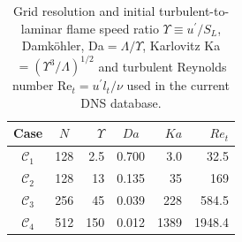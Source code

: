 \begin{table}[]
\centering
\begin{tabular}{ccrcrr}
\toprule
Case & $N$ & $\Upsilon$ & $Da$ & $Ka$ & $Re_t$ \\
\midrule
$\mathcal{C}_1$ & 128 & 2.5 & 0.700 & 3.0 & 32.5 \\
$\mathcal{C}_2$ & 128 & 13 & 0.135 & 35 & 169 \\
$\mathcal{C}_3$ & 256 & 45 & 0.039 & 228 & 584.5 \\
$\mathcal{C}_4$ & 512 & 150 & 0.012 & 1389 & 1948.4\\
\bottomrule
\end{tabular}
\caption{Grid resolution and initial turbulent-to-laminar flame speed ratio $\Upsilon \equiv u^{\prime}/S_L$,  Damk\"ohler, Da$=\Lambda/\Upsilon$, Karlovitz Ka$=(\Upsilon^3/\Lambda)^{1/2}$ and
 turbulent Reynolds number $\mathrm{Re}_t=u^{\prime}l_t/\nu$ used in the current DNS database.}
\label{tab:dns_details}
\end{table}
